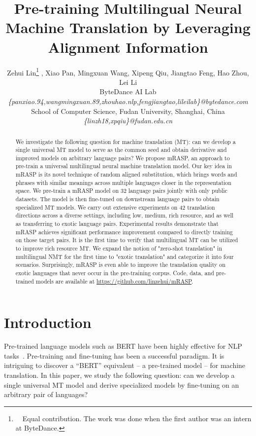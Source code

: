\documentclass[11pt,a4paper]{article}
\title{Pre-training Multilingual Neural Machine Translation by Leveraging Alignment Information}
\author{Zehui Lin\thanks{\ \ Equal contribution. The work was done when the first author was an intern at ByteDance.} , 
Xiao Pan\footnotemark[1] , 
Mingxuan Wang, 
Xipeng Qiu,
Jiangtao Feng,
Hao Zhou,
Lei Li \\
  ByteDance AI Lab \\
  \textit{\{panxiao.94,wangmingxuan.89,zhouhao.nlp,fengjiangtao,lileilab\}@bytedance.com} \\
  School of Computer Science, Fudan University, Shanghai, China \\
  \textit{\{linzh18,xpqiu\}@fudan.edu.cn} \\
  }
\date{}
\newcommand{\method}{mRASP\xspace}
\begin{document}
\maketitle


\begin{abstract}


We investigate the following question for machine translation (MT):
can we develop a single universal MT model to serve as the common seed and obtain derivative and improved models on arbitrary language pairs?
We propose \method, an approach to pre-train a universal multilingual neural machine translation model.
Our key idea in \method is its novel technique of random aligned substitution, which brings words and phrases with similar meanings across multiple languages closer in the representation space. 
We pre-train a \method model on 32 language pairs jointly with only public datasets. 
The model is then fine-tuned on downstream language pairs to obtain specialized MT models.
We carry out extensive experiments on 42 translation directions across a diverse settings, including low, medium, rich resource, and as well as transferring to exotic language pairs.  
Experimental results demonstrate that \method
 achieves significant performance improvement
 compared to directly training on those target pairs. 
It is the first time to verify that multilingual MT can be utilized to improve rich resource MT.
We expand the notion of "zero-shot translation" in multilingual NMT for the first time to "exotic translation" and categorize it into four scenarios.
Surprisingly, \method is even able to improve the translation quality on exotic languages that never occur in the pre-training corpus. 
Code, data, and pre-trained models are available at \url{https://github.com/linzehui/mRASP}.



%
 \end{abstract}

\section{Introduction}
\label{sec:intro}


Pre-trained language models such as BERT have been highly effective for NLP tasks~\cite{DBLP:conf/naacl/PetersNIGCLZ18,DBLP:conf/naacl/DevlinCLT19,radford2019language,DBLP:conf/nips/ConneauL19,Liu2019RoBERTaAR,DBLP:conf/nips/YangDYCSL19}.
Pre-training and fine-tuning has been a successful paradigm. 
It is intriguing to discover a ``BERT'' equivalent -- a pre-trained model -- for machine translation. 
In this paper, we study the following question: 
can we develop a single universal MT model and derive specialized models by fine-tuning on an arbitrary pair of languages?
\end{document}
